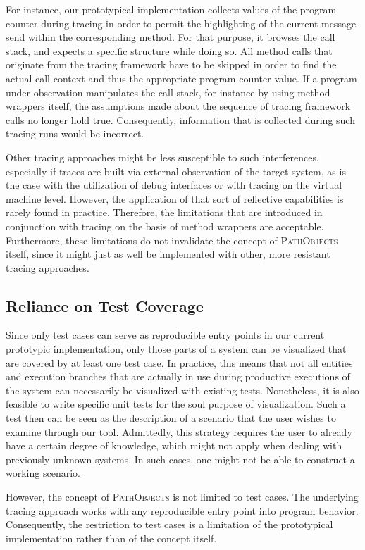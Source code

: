 For instance, our prototypical implementation collects values of the program counter during tracing in order to permit the highlighting of the current message send within the corresponding method.
For that purpose, it browses the call stack, and expects a specific structure while doing so.
All method calls that originate from the tracing framework have to be skipped in order to find the actual call context and thus the appropriate program counter value.
If a program under observation manipulates the call stack, for instance by using method wrappers itself, the assumptions made about the sequence of tracing framework calls no longer hold true.
Consequently, information that is collected during such tracing runs would be incorrect.

Other tracing approaches might be less susceptible to such interferences, especially if traces are built via external observation of the target system, as is the case with the utilization of debug interfaces or with tracing on the virtual machine level.
However, the application of that sort of reflective capabilities is rarely found in practice.
Therefore, the limitations that are introduced in conjunction with tracing on the basis of method wrappers are acceptable.
Furthermore, these limitations do not invalidate the concept of \textsc{PathObjects} itself, since it might just as well be implemented with other, more resistant tracing approaches.

\subsection{Reliance on Test Coverage}
\label{ss:DiscussionLimitationsCoverage}
Since only test cases can serve as reproducible entry points in our current prototypic implementation, only those parts of a system can be visualized that are covered by at least one test case.
In practice, this means that not all entities and execution branches that are actually in use during productive executions of the system can necessarily be visualized with existing tests.
Nonetheless, it is also feasible to write specific unit tests for the soul purpose of visualization.
Such a test then can be seen as the description of a scenario that the user wishes to examine through our tool.
Admittedly, this strategy requires the user to already have a certain degree of knowledge, which might not apply when dealing with previously unknown systems.
In such cases, one might not be able to construct a working scenario.

However, the concept of \textsc{PathObjects} is not limited to test cases.
The underlying tracing approach works with any reproducible entry point into program behavior.
Consequently, the restriction to test cases is a limitation of the prototypical implementation rather than of the concept itself.

